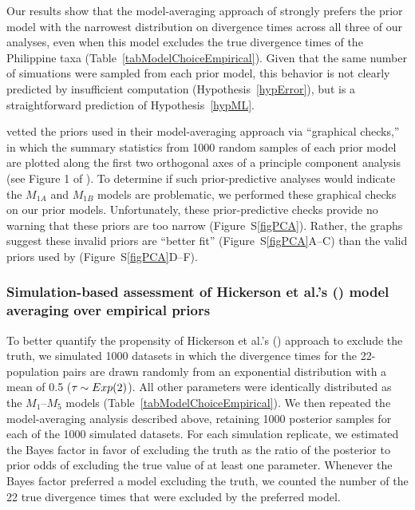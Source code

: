 Our results show that the model-averaging approach of \citet{Hickerson2013}
strongly prefers the prior model with the narrowest distribution on divergence
times across all three of our analyses, even when this model excludes the true
divergence times of the Philippine taxa
(Table~\ref{tabModelChoiceEmpirical}).
Given that the same number of simuations were sampled from each prior model,
this behavior is not clearly predicted by insufficient computation
(Hypothesis~\ref{hypError}), but is a straightforward prediction of
Hypothesis~\ref{hypML}.

\citet{Hickerson2013} vetted the priors used in their model-averaging
approach via ``graphical checks,'' in which the summary statistics from 1000
random samples of each prior model are plotted along the first two orthogonal
axes of a principle component analysis (see Figure 1 of \citet{Hickerson2013}).
To determine if such prior-predictive analyses would indicate the $M_{1A}$ and
$M_{1B}$ models are problematic, we performed these graphical checks on our
prior models.
Unfortunately, these prior-predictive checks provide no warning that these
priors are too narrow (Figure~S\ref{figPCA}).
Rather, the graphs suggest these invalid priors are ``better fit''
(Figure~S\ref{figPCA}A--C) than the valid priors used by \citet{Oaks2012}
(Figure~S\ref{figPCA}D--F).


\subsubsection{Simulation-based assessment of Hickerson et al.'s
    (\citeyear{Hickerson2013}) model averaging over empirical priors}

To better quantify the propensity of Hickerson et al.'s
(\citeyear{Hickerson2013}) approach to exclude the truth, we simulated 1000
datasets in which the divergence times for the 22-population pairs are drawn
randomly from an exponential distribution with a mean of 0.5 ($\tau_{} \sim
Exp(2)$).
All other parameters were identically distributed as the $M_1$--$M_5$ models
(Table~\ref{tabModelChoiceEmpirical}).
We then repeated the model-averaging  analysis described above, retaining 1000
posterior samples for each of the 1000 simulated datasets.
For each simulation replicate, we estimated the Bayes factor in favor
of excluding the truth as the ratio of the posterior to prior odds of
excluding the true value of at least one parameter.
Whenever the Bayes factor preferred a model excluding the truth, we counted the
number of the 22 true divergence times that were excluded by the preferred
model.

